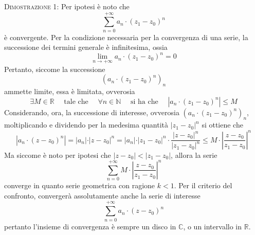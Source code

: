 \documentclass[a4paper]{extarticle}
\begin{document}
\vspace{2em}
\noindent
\normalfont \normalsize
\textsc{Dimostrazione 1}: Per ipotesi è noto che
\[\sum_{n=0}^{+\infty} a_n \cdot (z_1-z_0)^n\]
è convergente. Per la condizione necessaria per la convergenza di una serie, la successione dei termini generale è infinitesima, ossia
\[\lim_{n \to +\infty} a_n \cdot (z_1-z_0)^n = 0\]
Pertanto, siccome la successione 
\[\left(a_n \cdot (z_1 - z_0)^n \right)_n\]
ammette limite, essa è limitata, ovverosia
\[\exists M \in \mathbb{R} \hspace{1em} \text{ tale che } \hspace{1em} \forall n \in \mathbb{N} \hspace{1em} \text{ si ha che } \hspace{1em} \left \vert a_n \cdot (z_1-z_0)^n \right \vert \leq M\]
Considerando, ora, la successione di interesse, ovverosia $(a_n \cdot (z_1-z_0)^n)_n$, moltiplicando e dividendo per la medesima quantità $\vert z_1-z_0 \vert^n$ si ottiene che
\[\left \vert a_n \cdot (z-z_0)^n \right \vert = \vert a_n \vert \cdot \vert z-z_0 \vert^n = \vert a_n \vert \cdot \vert z_1-z_0 \vert^n \cdot \dfrac{\vert z-z_0 \vert^n}{\vert z_1-z_0 \vert^n} \leq M \cdot \left \vert \dfrac{z-z_0}{z_1-z_0} \right \vert^n\]
Ma siccome è noto per ipotesi che $\left \vert z-z_0 \right \vert < \left \vert z_1-z_0 \right \vert$, allora la serie
\[\sum_{n=0}^{+\infty} M \cdot \left \vert \dfrac{z-z_0}{z_1-z_0} \right \vert^n\]
converge in quanto serie geometrica con ragione $k<1$. Per il criterio del confronto, convergerà assolutamente anche la serie di interesse
\[\sum_{n=0}^{+\infty} a_n \cdot (z-z_0)^n\]
pertanto l'insieme di convergenza è sempre un disco in $\mathbb{C}$, o un intervallo in $\mathbb{R}$.
\end{document}
